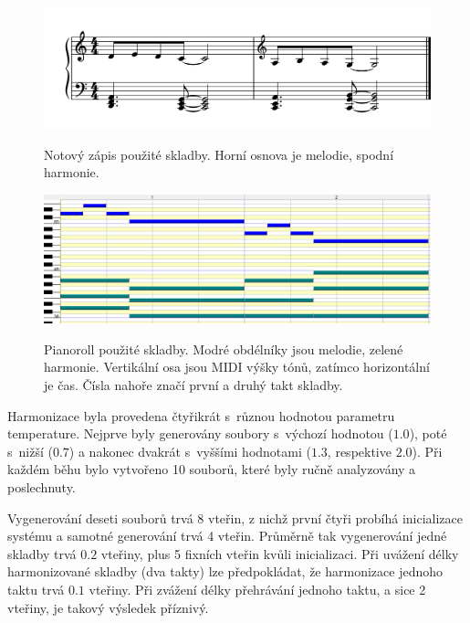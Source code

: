 \begin{figure}[h]\centering
    \centering
    \includegraphics[width=0.8\linewidth]{obrazky/KratkaSkladbaKHarmonizaciNoty.png}\\[1pt]  
    \caption{Notový zápis použité skladby. Horní osnova je melodie, spodní harmonie.}    
    \label{obrazekNotyKratkeZname}
\end{figure}
\begin{figure}[h]\centering
    \centering
    \includegraphics[width=0.8\linewidth]{obrazky/KratkaSkladbaKHarmonizaciPianoRoll.png}\\[1pt]  
    \caption{Pianoroll použité skladby. Modré obdélníky jsou melodie, zelené harmonie.
    Vertikální osa jsou MIDI výšky tónů, zatímco horizontální je čas. 
    Čísla nahoře značí první a druhý takt skladby.}    
    \label{obrazekPianoRollKratkeZname}
\end{figure}

Harmonizace byla provedena čtyřikrát 
s~různou hodnotou parametru temperature.
Nejprve byly generovány soubory s~výchozí hodnotou ($1.0$),
poté s~nižší ($0.7$) a nakonec dvakrát s~vyššími hodnotami ($1.3$, respektive $2.0$).
Při každém běhu bylo vytvořeno 10 souborů,
které byly ručně analyzovány a poslechnuty.
\par
Vygenerování deseti souborů trvá 8 vteřin,
z nichž první čtyři probíhá inicializace systému
a samotné generování trvá 4 vteřin.
Průměrně tak vygenerování jedné skladby trvá $0.2$ vteřiny,
plus 5 fixních vteřin kvůli inicializaci.
Při uvážení délky harmonizované skladby (dva takty)
lze předpokládat, že harmonizace jednoho taktu trvá $0.1$ vteřiny.
Při zvážení délky přehrávání jednoho taktu, a sice 2 vteřiny, 
je takový výsledek příznivý.
\par

